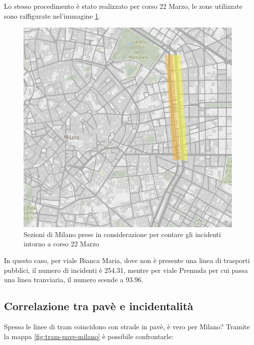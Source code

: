 \documentclass[a4paper]{report}
\begin{document}

Lo stesso procedimento è stato realizzato per corso 22 Marzo, le zone utilizzate sono 
raffigurate nel'immagine \ref{fig:zona-22marzo-rect}. 

\begin{figure}
    \includegraphics[width=\linewidth]{../src/atm/zona_22marzo_rect.png}
    \caption{Sezioni di Milano prese in considerazione per contare gli incidenti intorno a corso 22 Marzo}
    \label{fig:zona-22marzo-rect}
\end{figure}

In questo caso, per viale Bianca Maria, dove non è presente una linea di trasporti pubblici, 
il numero di incidenti è 254.31, mentre per viale Premuda per cui passa una linea tranviaria, 
il numero scende a 93.96.


\subsection{Correlazione tra pavè e incidentalità}

Spesso le linee di tram coincidono con strade in pavè, è vero per Milano? 
Tramite la mappa \ref{fig:tram-pave-milano} è possibile confrontarle: 
\end{document}
